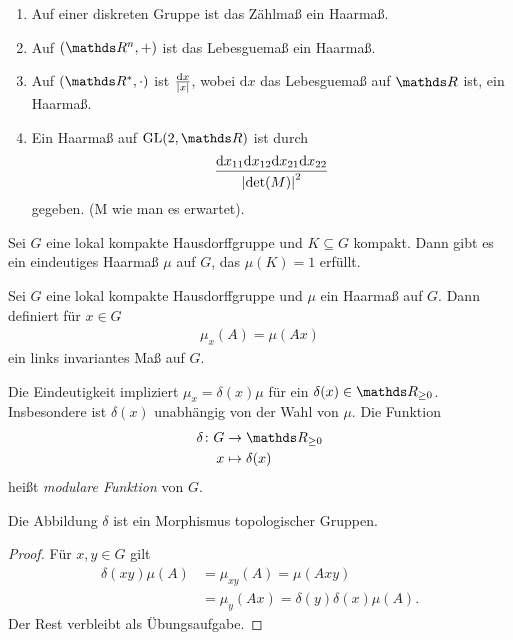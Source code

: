 \begin{bsp}
\begin{enumerate}[label=\roman*)]
\item Auf einer diskreten Gruppe ist das Zählmaß ein Haarmaß.
\item Auf $(\Rn,+)$ ist das Lebesguemaß ein Haarmaß.
\item Auf $(\R^\ast,\cdot)$ ist $\frac{\mathrm{d}x}{\left\vert x\right\vert}$, wobei $\mathrm{d}x$ das Lebesguemaß auf $\R$ ist, ein Haarmaß.
\item Ein Haarmaß auf $\GL(2,\R)$ ist durch
\begin{align*}
\frac{\mathrm{d}x_{11}\mathrm{d}x_{12}\mathrm{d}x_{21}\mathrm{d}x_{22}}{\left\vert\det(M)\right\vert^2}
\end{align*}
gegeben. (M wie man es erwartet).
\end{enumerate}
\end{bsp}

\begin{thm}
Sei $G$ eine lokal kompakte Hausdorffgruppe und $K\subseteq G$ kompakt. Dann gibt es ein eindeutiges Haarmaß $\mu$ auf $G$, das $\mu(K)=1$ erfüllt.
\end{thm}


\begin{defi}
Sei $G$ eine lokal kompakte Hausdorffgruppe und $\mu$ ein Haarmaß auf $G$.
Dann definiert für $x\in G$
\begin{align*}
\mu_x(A)=\mu(Ax)
\end{align*}
ein links invariantes Maß auf $G$.
\end{defi}

\begin{defi}
Die Eindeutigkeit impliziert $\mu_x=\delta(x) \mu$ für ein $\delta(x)\in \R_{\geq 0}$.
Insbesondere ist $\delta(x)$ unabhängig von der Wahl von $\mu$.
Die Funktion
\begin{align*}
\delta \colon G &\to \R_{\geq 0}\\
x &\mapsto \delta(x)
\end{align*}
heißt \emph{modulare Funktion} von $G$.
\end{defi}

\begin{prop}
Die Abbildung $\delta$ ist ein Morphismus topologischer Gruppen.
\end{prop}
\begin{proof}
Für $x,y\in G$ gilt
\begin{align*}
\delta(xy)\mu(A)&=\mu_{xy}(A)=\mu(Axy)\\
&=\mu_y(Ax)=\delta(y)\delta(x)\mu(A).
\end{align*}
Der Rest verbleibt als Übungsaufgabe.
\end{proof}

